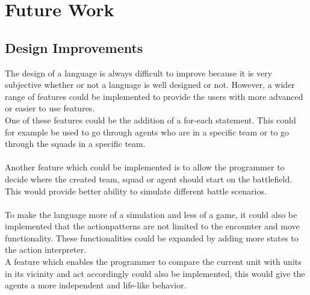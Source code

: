 \chapter{Future Work}
\section{Design Improvements}
The design of a language is always difficult to improve because it is very subjective whether or not a language is well designed or not. However, a wider range of features could be implemented to provide the users with more advanced or easier to use features.\\
\indent One of these features could be the addition of a for-each statement. This could for example be used to go through agents who are in a specific team or to go through the squads in a specific team.\\
\\
Another feature which could be implemented is to allow the programmer to decide where the created team, squad or agent should start on the battlefield. This would provide better ability to simulate different battle scenarios.\\
 \\
To make the language more of a simulation and less of a game, it could also be implemented that the actionpatterns are not limited to the encounter and move functionality. These functionalities could be expanded by adding more states to the action interpreter. \\
A feature which enables the programmer to compare the current unit with units in its vicinity and act accordingly could also be implemented, this would give the agents a more independent and life-like behavior.

